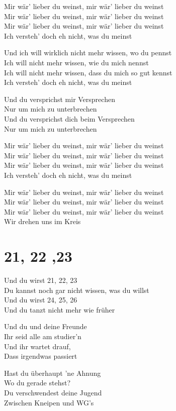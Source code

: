 \documentclass[]{book}
\begin{document}
Mir wär' lieber du weinst, mir wär' lieber du weinst\\
Mir wär' lieber du weinst, mir wär' lieber du weinst\\
Mir wär' lieber du weinst, mir wär' lieber du weinst\\
Ich versteh' doch eh nicht, was du meinst

Und ich will wirklich nicht mehr wissen, wo du pennst\\
Ich will nicht mehr wissen, wie du mich nennst\\
Ich will nicht mehr wissen, dass du mich so gut kennst\\
Ich versteh' doch eh nicht, was du meinst

Und du versprichst mir Versprechen\\
Nur um mich zu unterbrechen\\
Und du versprichst dich beim Versprechen\\
Nur um mich zu unterbrechen

Mir wär' lieber du weinst, mir wär' lieber du weinst\\
Mir wär' lieber du weinst, mir wär' lieber du weinst\\
Mir wär' lieber du weinst, mir wär' lieber du weinst\\
Ich versteh' doch eh nicht, was du meinst

Mir wär' lieber du weinst, mir wär' lieber du weinst\\
Mir wär' lieber du weinst, mir wär' lieber du weinst\\
Mir wär' lieber du weinst, mir wär' lieber du weinst\\
Wir drehen uns im Kreis

\hypertarget{section-4}{%
\section{21, 22 ,23}\label{section-4}}

Und du wirst 21, 22, 23\\
Du kannst noch gar nicht wissen, was du willst\\
Und du wirst 24, 25, 26\\
Und du tanzt nicht mehr wie früher

Und du und deine Freunde\\
Ihr seid alle am studier'n\\
Und ihr wartet drauf,\\
Dass irgendwas passiert

Hast du überhaupt 'ne Ahnung\\
Wo du gerade stehst?\\
Du verschwendest deine Jugend\\
Zwischen Kneipen und WG's
\end{document}
